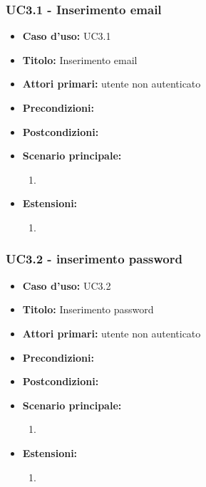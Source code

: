 \documentclass[casi-duso]{subfiles}
\begin{document}
\subsubsection{UC3.1 - Inserimento email}
\label{subsub:uc2.1utente}
\begin{itemize}
  \item \textbf{Caso d’uso:} UC3.1 
  \item \textbf{Titolo:} Inserimento email
  \item \textbf{Attori primari:} utente non autenticato
  \item \textbf{Precondizioni:} 
  \item \textbf{Postcondizioni:}
  \item \textbf{Scenario principale:} 
  \begin{enumerate}
    \item 
  \end{enumerate}  
  \item \textbf{Estensioni:} 
  \begin{enumerate}
    \item 
  \end{enumerate}  
\end{itemize}

\subsubsection{UC3.2 - inserimento password}
\label{subsub:uc3.2utente}
\begin{itemize}
  \item \textbf{Caso d’uso:} UC3.2 
  \item \textbf{Titolo:} Inserimento password
  \item \textbf{Attori primari:} utente non autenticato
  \item \textbf{Precondizioni:} 
  \item \textbf{Postcondizioni:}
  \item \textbf{Scenario principale:} 
  \begin{enumerate}
    \item 
  \end{enumerate}  
  \item \textbf{Estensioni:} 
  \begin{enumerate}
    \item 
  \end{enumerate}  
\end{itemize}
\end{document}
